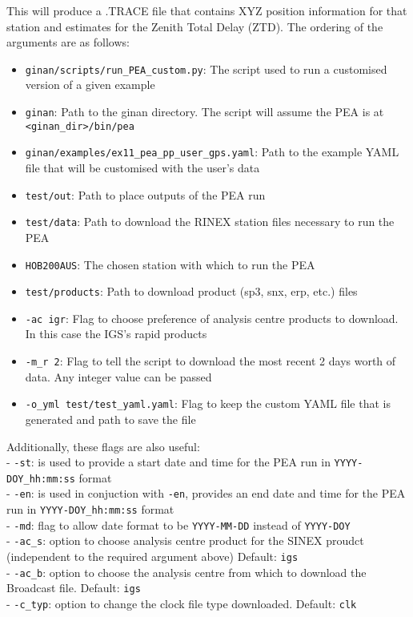 This will produce a .TRACE file that contains XYZ position information
for that station and estimates for the Zenith Total Delay (ZTD). 
The ordering of the arguments are as follows:
\begin{itemize}
\item \texttt{ginan/scripts/run\_PEA\_custom.py}: The script used to run a customised version of a given example \\
\item \texttt{ginan}: Path to the ginan directory. The script will assume the PEA is at \texttt{<ginan\_dir>/bin/pea} \\
\item \texttt{ginan/examples/ex11\_pea\_pp\_user\_gps.yaml}: Path to the example YAML file that will be customised with the user's data \\
\item \texttt{test/out}: Path to place outputs of the PEA run \\
\item \texttt{test/data}: Path to download the RINEX station files necessary to run the PEA \\
\item \texttt{HOB200AUS}: The chosen station with which to run the PEA \\
\item \texttt{test/products}: Path to download product (sp3, snx, erp, etc.) files \\
\item \texttt{-ac igr}: Flag to choose preference of analysis centre products to download. In this case the IGS's rapid products \\
\item \texttt{-m\_r 2}: Flag to tell the script to download the most recent 2 days worth of data. Any integer value can be passed \\
\item \texttt{-o\_yml test/test\_yaml.yaml}: Flag to keep the custom YAML file that is generated and path to save the file\\
\end{itemize}

Additionally, these flags are also useful:\\
- \texttt{-st}: is used to provide a start date and time for the PEA run in \texttt{YYYY-DOY\_hh:mm:ss} format \\
- \texttt{-en}: is used in conjuction with \texttt{-en}, provides an end date and time for the PEA run in \texttt{YYYY-DOY\_hh:mm:ss} format\\
- \texttt{-md}: flag to allow date format to be \texttt{YYYY-MM-DD} instead of \texttt{YYYY-DOY}\\
- \texttt{-ac\_s}: option to choose analysis centre product for the SINEX proudct (independent to the required argument above) Default: \texttt{igs}\\
- \texttt{-ac\_b}: option to choose the analysis centre from which to download the Broadcast file. Default: \texttt{igs}\\
- \texttt{-c\_typ}: option to change the clock file type downloaded. Default: \texttt{clk}\\


